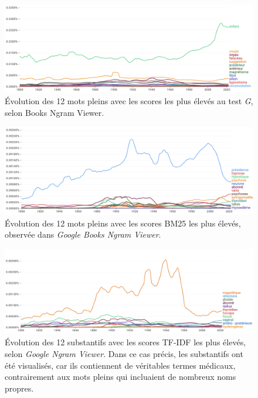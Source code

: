 \begin{figure}[h]
	\centering
	\includegraphics[width=1\textwidth]{img/g-test_google_ngram.png}
	\caption{Évolution des 12 mots pleins avec les scores les plus élevés au test \textit{G}, selon Books Ngram Viewer.}
	\label{fig:g-test_google_ngram}
\end{figure}

\begin{figure}[h]
	\centering
	\includegraphics[width=1\textwidth]{img/bm25_google_ngram.png}
	\caption{Évolution des 12 mots pleins avec les scores \textsc{BM25} les plus élevés, observée dans \textit{Google Books Ngram Viewer}.}
	\label{fig:bm25_google_ngram}
\end{figure}

\begin{figure}[h]
	\centering
	\includegraphics[width=1\textwidth]{img/tf-idf_google_ngram.png}
	\caption{Évolution des 12 substantifs avec les scores \textsc{TF-IDF} les plus élevés, selon \textit{Google Ngram Viewer}. Dans ce cas précis, les substantifs ont été visualisés, car ils contiennent de véritables termes médicaux, contrairement aux mots pleins qui incluaient de nombreux noms propres.}
	\label{fig:tf-idf_google_ngram}
\end{figure}

